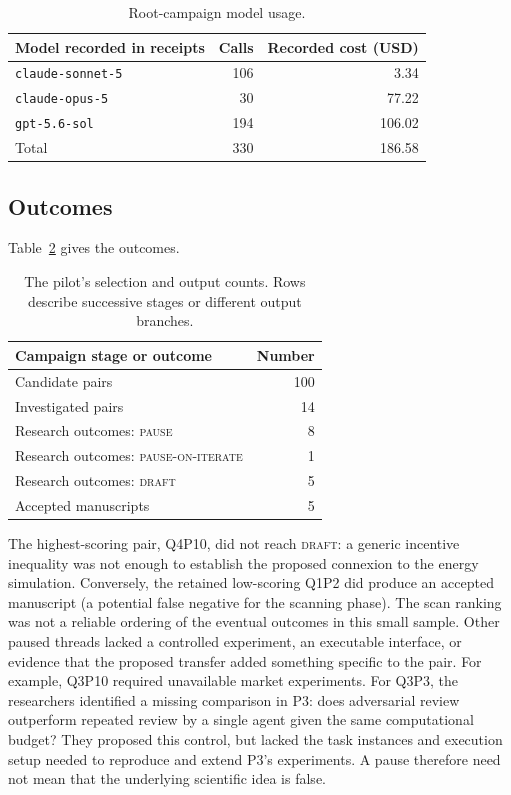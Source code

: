 \documentclass[11pt,a4paper]{article}
\newcommand{\pair}[1]{\mbox{#1}}
\newcommand{\st}[1]{\textsc{#1}}
\newcommand{\file}[1]{\texttt{#1}}
\begin{document}
\begin{table}[htbp]
\centering
\begin{tabular}{lrr}
\toprule
Model recorded in receipts & Calls & Recorded cost (USD) \\
\midrule
\file{claude-sonnet-5} & 106 & 3.34 \\
\file{claude-opus-5} & 30 & 77.22 \\
\file{gpt-5.6-sol} & 194 & 106.02 \\
\midrule
Total & 330 & 186.58 \\
\bottomrule
\end{tabular}
\caption{Root-campaign model usage.}
\label{tab:pilot-models}
\end{table}

\subsection{Outcomes}

Table~\ref{tab:pilot-outcomes} gives the outcomes.
\begin{table}[htbp]
\centering
\begin{tabularx}{0.72\linewidth}{@{}Xr@{}}
\toprule
Campaign stage or outcome & Number \\
\midrule
Candidate pairs & 100 \\
Investigated pairs & 14 \\
Research outcomes: \st{pause} & 8 \\
Research outcomes: \st{pause-on-iterate} & 1 \\
Research outcomes: \st{draft} & 5 \\
Accepted manuscripts & 5 \\
\bottomrule
\end{tabularx}
\caption{The pilot's selection and output counts. Rows describe successive
stages or different output branches.}
\label{tab:pilot-outcomes}
\end{table}

The highest-scoring pair, \pair{Q4P10}, did not reach \st{draft}: a generic incentive
inequality was not enough to establish the proposed connexion to the energy
simulation. Conversely, the retained low-scoring \pair{Q1P2} did produce an accepted
manuscript (a potential false negative for the scanning phase). The scan ranking
was not a reliable ordering of the eventual outcomes in this small sample.
Other paused
threads lacked a controlled experiment, an executable interface, or evidence
that the proposed transfer added something specific to the pair. For example,
\pair{Q3P10} required unavailable market experiments. For \pair{Q3P3}, the researchers
identified a missing comparison in \pair{P3}: does adversarial review outperform
repeated review by a single agent given the same computational budget? They
proposed this control, but lacked the task instances and execution setup needed
to reproduce and extend \pair{P3}'s experiments. A pause
therefore need not mean that the underlying scientific idea is false.
\end{document}
